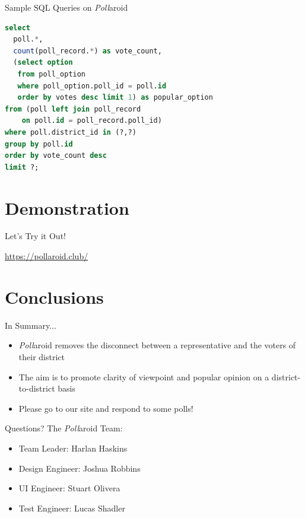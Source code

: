 \documentclass[11pt,aps,prb,groupedaddress,nofootinbib,floatfix]{beamer}
\newcommand{\pollaroid}{\emph{Poll}aroid}
\begin{document}
%
%
\begin{frame}[fragile]{Sample SQL Queries on \pollaroid}

\begin{lstlisting}[language=SQL]
select
  poll.*,
  count(poll_record.*) as vote_count,
  (select option
   from poll_option
   where poll_option.poll_id = poll.id
   order by votes desc limit 1) as popular_option
from (poll left join poll_record
    on poll.id = poll_record.poll_id)
where poll.district_id in (?,?)
group by poll.id
order by vote_count desc
limit ?;
\end{lstlisting}
\end{frame}

\section{Demonstration}


%
%
\begin{frame}{Let's Try it Out!}
\begin{center}
\url{https://pollaroid.club/} 
\end{center}
\end{frame}

\section{Conclusions}


%
%
\begin{frame}{In Summary...}
\begin{itemize}
	\item \pollaroid{} removes the disconnect between a representative and the voters of their district
	\item The aim is to promote clarity of viewpoint and popular opinion on a district-to-district basis
	\item Please go to our site and respond to some polls!
\end{itemize}
\end{frame}

\begin{frame}{Questions?}
The \pollaroid{} Team:
\begin{itemize}
	\item Team Leader: Harlan Haskins
	\item Design Engineer: Joshua Robbins
	\item UI Engineer: Stuart Olivera
	\item Test Engineer: Lucas Shadler
\end{itemize}
\end{frame}
\end{document}
